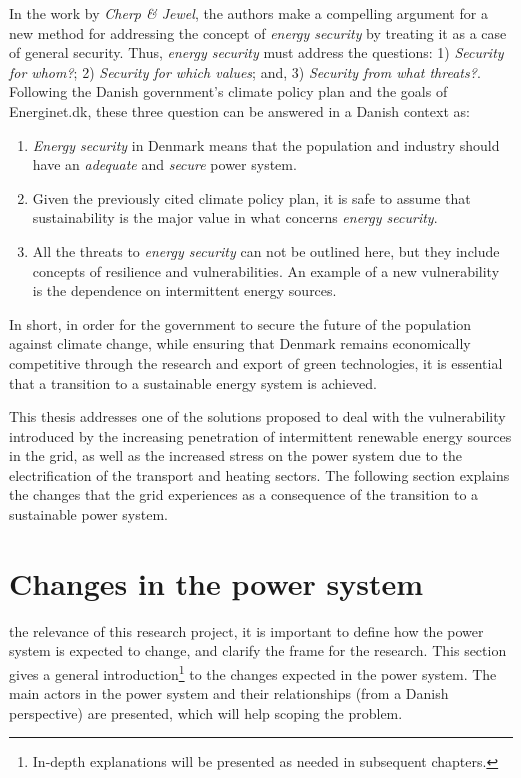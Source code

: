 In the work by \textit{Cherp \& Jewel}, the authors make a compelling argument for a new method for addressing the concept of \emph{energy security} by treating it as a case of general security. Thus, \emph{energy security} must address the questions: 1) \emph{Security for whom?}; 2) \emph{Security for which values}; and, 3) \emph{Security from what threats?}. Following the Danish government's climate policy plan and the goals of Energinet.dk, these three question can be answered in a Danish context as:
\begin{enumerate}
	\item \emph{Energy security} in Denmark means that the population and industry should have an \emph{adequate} and \emph{secure} power system.
	\item Given the previously cited climate policy plan, it is safe to assume that sustainability is the major value in what concerns \emph{energy security}.
	\item All the threats to \emph{energy security} can not be outlined here, but they include concepts of resilience and vulnerabilities. An example of a new vulnerability is the dependence on intermittent energy sources.
\end{enumerate}

In short, in order for the government to secure the future of the population against climate change, while ensuring that Denmark remains economically competitive through the research and export of green technologies, it is essential that a transition to a sustainable energy system is achieved. 

This thesis addresses one of the solutions proposed to deal with the vulnerability introduced by the increasing penetration of intermittent renewable energy sources in the grid, as well as the increased stress on the power system due to the electrification of the transport and heating sectors. The following section explains the changes that the grid experiences as a consequence of the transition to a sustainable power system.
\section{Changes in the power system}%
\label{sec:powsysdesc}
  the relevance of this research project, it is important to define how the power system is expected to change, and clarify the frame for the research. This section gives a general introduction\footnote{In-depth explanations will be presented as needed in subsequent chapters.} to the changes expected in the power system. The main actors in the power system and their relationships (from a Danish perspective) are presented, which will help scoping the problem.
